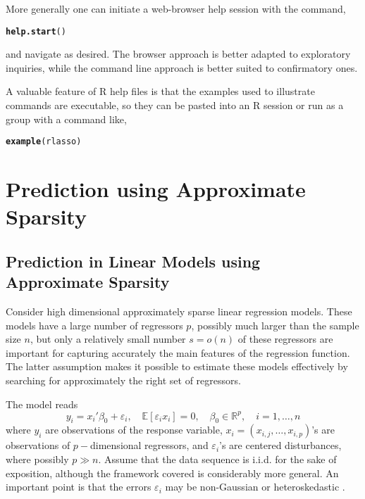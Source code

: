 \documentclass{amsart}\usepackage[]{graphicx}\usepackage[]{color}
\makeatletter
\newcommand{\hlstd}[1]{\textcolor[rgb]{0.345,0.345,0.345}{#1}}%
\newcommand{\hlkwd}[1]{\textcolor[rgb]{0.737,0.353,0.396}{\textbf{#1}}}%
\newenvironment{kframe}{%
 \def\at@end@of@kframe{}%
 \ifinner\ifhmode%
  \def\at@end@of@kframe{\end{minipage}}%
  \begin{minipage}{\columnwidth}%
 \fi\fi%
 \def\FrameCommand##1{\hskip\@totalleftmargin \hskip-\fboxsep
 \colorbox{shadecolor}{##1}\hskip-\fboxsep
     \hskip-\linewidth \hskip-\@totalleftmargin \hskip\columnwidth}%
 \MakeFramed {\advance\hsize-\width
   \@totalleftmargin\z@ \linewidth\hsize
   \@setminipage}}%
 {\par\unskip\endMakeFramed%
 \at@end@of@kframe}
\newenvironment{knitrout}{}{} %
\newcommand{\R}{{\normalfont\textsf{R }}{}}
\makeatother
\begin{document}
More generally one can initiate a web-browser help session with the command,
\begin{knitrout}
\color{fgcolor}\begin{kframe}
\begin{alltt}
\hlkwd{help.start}\hlstd{()}
\end{alltt}
\end{kframe}
\end{knitrout}
and navigate as desired.  The browser approach is better adapted to exploratory inquiries, while the command line approach is better suited to confirmatory ones.

A valuable feature of \R help files is that the examples used to illustrate commands are executable, so they can be pasted into an \R session or run as a group with
a command like,

\begin{knitrout}
\color{fgcolor}\begin{kframe}
\begin{alltt}
\hlkwd{example}\hlstd{(rlasso)}
\end{alltt}
\end{kframe}
\end{knitrout}



\section{Prediction using Approximate Sparsity}


\subsection{Prediction in Linear Models using Approximate Sparsity}


Consider high dimensional approximately sparse linear regression models. These models have a large number of regressors $p$, possibly much larger than the sample size $n$, but only a relatively small number $s =o(n)$ of these regressors are important for capturing accurately the main features of the regression function. The latter assumption makes it possible to estimate these models effectively by searching for approximately the right set of regressors.

The model reads \[ y_i = x_i' \beta_0  + \varepsilon_i, \quad \mathbb{E}[\varepsilon_i x_i]=0, \quad \beta_0 \in \mathbb{R}^p, 
\quad i=1,\ldots,n \]
where $y_i$ are observations of the response variable, $x_i=(x_{i,j}, \ldots, x_{i,p})$'s are observations of $p-$dimensional  regressors, and $\varepsilon_i$'s are centered disturbances, where possibly $p \gg n$.   Assume that the data sequence is
i.i.d. for the sake of exposition, although the framework covered is considerably more general. An important point is that the errors $\varepsilon_i$ may be non-Gaussian or heteroskedastic \citep{BCCH12}.
\end{document}
